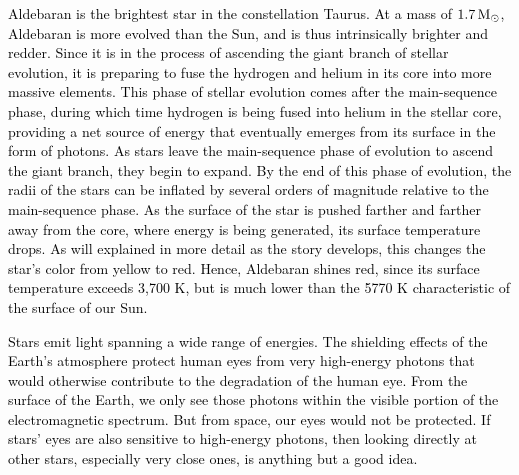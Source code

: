 \documentclass[main.tex]{subfiles}
\begin{document}
\begin{tcolorbox}[sharp corners, colback=red!30, colframe=red!80!blue, title=Box \refstepcounter{educhap1}\label{boxchap1:ald}\ref{boxchap1:ald} -- Aldebaran]
\par \textcolor{black} {Aldebaran is the brightest star in the constellation Taurus.  At a mass of $1.7\,\mathrm{M}_\odot$, Aldebaran is more evolved than the Sun, and is thus intrinsically brighter and redder.  Since it is in the process of ascending the giant branch of stellar evolution, it is preparing to fuse the hydrogen and helium in its core into more massive elements.  This phase of stellar evolution comes after the main-sequence phase, during which time hydrogen is being fused into helium in the stellar core, providing a net source of energy that eventually emerges from its surface in the form of photons.   As stars leave the main-sequence phase of evolution to ascend the giant branch, they begin to expand.  By the end of this phase of evolution, the radii of the stars can be inflated by several orders of magnitude relative to the main-sequence phase.  As the surface of the star is pushed farther and farther away from the core, where energy is being generated, its surface temperature drops.  As will explained in more detail as the story develops, this changes the star's color from yellow to red.  Hence, Aldebaran shines red, since its surface temperature exceeds 3,700 K, but is much lower than the 5770 K characteristic of the surface of our Sun.}
\end{tcolorbox}

\begin{tcolorbox}[sharp corners, colback=red!30, colframe=red!80!blue, title=Box \refstepcounter{educhap1}\label{boxchap1:se}\ref{boxchap1:se} -- Stellar Emission]
\par \textcolor{black} {Stars emit light spanning a wide range of energies.  The shielding effects of the Earth's atmosphere protect human eyes from very high-energy photons that would otherwise contribute to the degradation of the human eye.  From the surface of the Earth, we only see those photons within the visible portion of the electromagnetic spectrum.  But from space, our eyes would not be protected.  If stars' eyes are also sensitive to high-energy photons, then looking directly at other stars, especially very close ones, is anything but a good idea.}
\end{tcolorbox}
\end{document}
